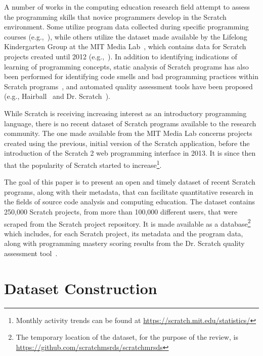 \documentclass[10pt, conference]{IEEEtran}
\begin{document}
A number of works in the computing education research field attempt to assess the programming skills that novice programmers develop in the Scratch environment.
Some utilize program data collected during specific programming courses (e.g.,~\cite{meerbaum-salant_learning_2010, wilson_evaluation_2012, Maloney_2008}), while others utilize the dataset made available by the Lifelong Kindergarten Group at the MIT Media Lab~\cite{2017_scratch_dataset}, which contains data for Scratch projects created until 2012 (e.g.,~\cite{fields_2014, yang_2015, Dasgupta_2016}).
In addition to identifying indications of learning of programming concepts, static analysis of Scratch programs has also been performed for identifying code smells and bad programming practices within Scratch programs~\cite{Meerbaum_habits_2011, Aivaloglou_2016}, and automated quality assessment tools have been proposed (e.g., Hairball~\cite{boe_hairball:_2013} and Dr. Scratch~\cite{moreno_automatic_2014}).

While Scratch is receiving increasing interest as an introductory programming language, there is no recent dataset of Scratch programs available to the research community.
The one made available from the MIT Media Lab concerns projects created using the previous, initial version of the Scratch application, before the introduction of the Scratch 2 web programming interface in 2013.
It is since then that the popularity of Scratch started to increase\footnote{Monthly activity trends can be found at \url{https://scratch.mit.edu/statistics/}}.

The goal of this paper is to present an open and timely dataset of recent Scratch programs, along with their metadata, that can facilitate quantitative research in the fields of source code analysis and computing education.
The dataset contains 250,000 Scratch projects, from more than 100,000 different users, that were scraped from the Scratch project repository.
It is made available as a database\footnote{\label{dataseturl}The temporary location of the dataset, for the purpose of the review, is \url{https://github.com/scratchmsrds/scratchmrsds}} which includes, for each Scratch project, its metadata and the program data, along with programming mastery scoring results from the Dr. Scratch quality assessment tool~\cite{moreno_automatic_2014}.

\section{Dataset Construction}
\label{dataset}
\end{document}
